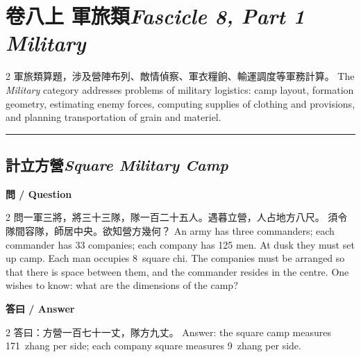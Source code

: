 \documentclass[11pt,a4paper]{article}
\newcommand{\bilingualsection}[2]{\section{#1\hfill\textit{\small #2}}}
\newcommand{\bilingualsubsection}[2]{\subsection{#1\quad\textit{#2}}}
\newcommand{\longline}{\noindent\rule{\textwidth}{0.4pt}}
\begin{document}
\newpage

\bilingualsection{卷八上 \quad 軍旅類}{Fascicle 8, Part 1 \quad Military}
\label{sec:fasc8a}

\begin{center}
\end{center}

\medskip

\begin{paracol}{2}
\textcolor{chinesecolor}{%
軍旅類算題，涉及營陣布列、敵情偵察、軍衣糧餉、輸運調度等軍務計算。
}
\switchcolumn
\textcolor{englishcolor}{%
The \textit{Military} category addresses problems of military logistics:
camp layout, formation geometry, estimating enemy forces, computing supplies
of clothing and provisions, and planning transportation of grain and materiel.
}
\end{paracol}

\vspace{0.8em}
\longline

\bilingualsubsection{計立方營}{Square Military Camp}

\vspace{0.4em}
\noindent\textbf{\textcolor{chinesecolor}{問} / \textcolor{englishcolor}{Question}}
\vspace{0.3em}
\begin{paracol}{2}
問一軍三將，將三十三隊，隊一百二十五人。遇暮立營，人占地方八尺。
須令隊間容隊，師居中央。欲知營方幾何？
\switchcolumn
An army has three commanders; each commander has 33 companies; each company
has 125 men. At dusk they must set up camp. Each man occupies 8~square chi.
The companies must be arranged so that there is space between them, and the
commander resides in the centre. One wishes to know: what are the dimensions
of the camp?
\end{paracol}

\vspace{0.4em}
\noindent\textbf{\textcolor{chinesecolor}{答曰} / \textcolor{englishcolor}{Answer}}
\vspace{0.2em}
\begin{paracol}{2}
答曰：方營一百七十一丈，隊方九丈。
\switchcolumn
Answer: the square camp measures 171~zhang per side; each company square
measures 9~zhang per side.
\end{paracol}
\end{document}
